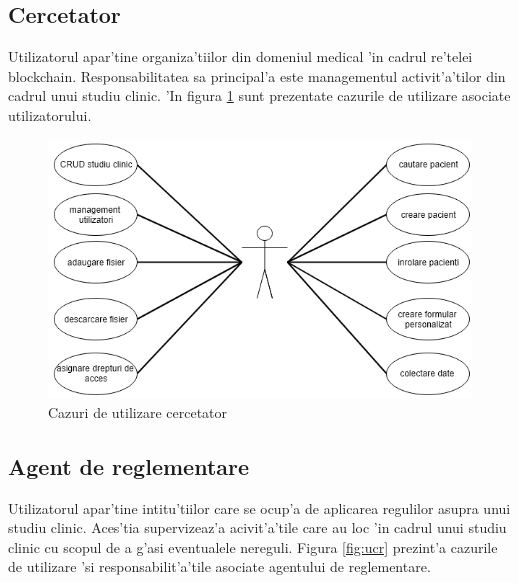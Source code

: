 \documentclass[12pt,a4paper,twoside]{report}
\begin{document}
\subsection{Cercetator} Utilizatorul apar'tine organiza'tiilor din domeniul medical 'in cadrul re'telei blockchain. Responsabilitatea sa principal'a este managementul activit'a'tilor din cadrul unui studiu clinic. 'In figura \ref{fig:ucc} sunt prezentate cazurile de utilizare asociate utilizatorului.

	\begin{figure}[H]
		\begin{center}
			\includegraphics[scale=0.6]{img/uc_cerc.PNG}
			\caption{Cazuri de utilizare cercetator}
  			\label{fig:ucc}
  		\end{center}
  	\end{figure}
  		
 
 

\subsection{Agent de reglementare} Utilizatorul apar'tine intitu'tiilor care se ocup'a de aplicarea regulilor asupra unui studiu clinic. Aces'tia supervizeaz'a acivit'a'tile care au loc 'in cadrul unui studiu clinic cu scopul de a g'asi eventualele nereguli. Figura \ref{fig:ucr} prezint'a cazurile de utilizare 'si responsabilit'a'tile asociate agentului de reglementare.
\end{document}
